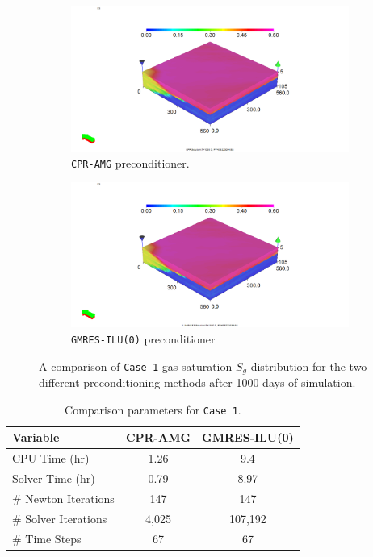 \begin{figure}
\centering
\begin{subfigure}{.5\textwidth}
  \centering
  \includegraphics[width=1.3\linewidth]{figures/case1_cpr_sgas.png}
  \caption{\texttt{CPR-AMG} preconditioner.}
\end{subfigure}%
\begin{subfigure}{.5\textwidth}
  \centering
  \includegraphics[width=1.3\linewidth]{figures/case1_ilu_sgas.png}
  \caption{\texttt{GMRES-ILU(0)} preconditioner}
\end{subfigure}
\caption{A comparison of \texttt{Case 1} gas saturation $S_{g}$ distribution for the two different preconditioning methods after 1000 days of simulation.}
\label{case1sg}
\end{figure}

\begin{table}[h!]
   \caption{Comparison parameters for \texttt{Case 1}.}
   \label{case1-tab}
   \small
   \centering
   \begin{tabular}{lcc}
   \toprule\toprule
   \textbf{Variable} & \textbf{CPR-AMG} & \textbf{GMRES-ILU(0)} \\
   \midrule
   CPU Time (hr) & 1.26 & 9.4 \\
   Solver Time (hr) & 0.79 & 8.97 \\
   \# Newton Iterations & 147 & 147 \\
   \# Solver Iterations & 4,025 & 107,192 \\
   \# Time Steps & 67 & 67 \\
   \bottomrule
   \end{tabular}
\end{table}

